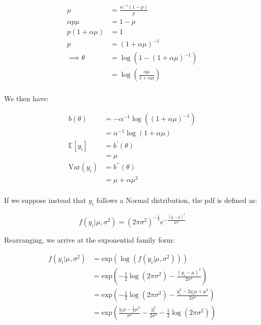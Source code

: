 \documentclass{report}
\begin{document}
\begin{equation}\label{eq:ex-glm-nb-dist-alpha-parameterization}
    \begin{aligned}
      \mu &= \frac{\alpha^{-1}(1-p)}{p} \\
      \alpha p \mu &= 1 - p \\
      p(1+\alpha\mu) &= 1 \\
      p &= (1 + \alpha\mu)^{-1} \\
      \implies \theta 
        &= \log\left(1 - (1+\alpha\mu)^{-1}\right) \\
        &= \log\left(\frac{\alpha\mu}{1+\alpha\mu}\right) \\
    \end{aligned}
\end{equation}

We then have:

\begin{equation}\label{eq:ex-glm-nb-dist-alpha-parameterization-mean-var}
    \begin{aligned}
      b(\theta)
        &= -\alpha^{-1}\log\left((1+\alpha\mu)^{-1}\right) \\
        &= \alpha^{-1}\log(1+\alpha\mu) \\
      \mathbb{E}[y_i]
        &= b^\prime(\theta) \\
        &= \mu \\
      \text{Var}(y_i)
        &= b^{\prime\prime}(\theta) \\
        &= \mu + \alpha\mu^2 \\
    \end{aligned}
\end{equation}

If we suppose instead that $y_i$ follows a Normal distribution, the \gls{pdf} is defined as:

\begin{equation}\label{eq:ex-glm-normal-dist}
    f(y_i|\mu, \sigma^2) = (2\pi\sigma^2)^{-\frac{1}{2}} e^{-\frac{(y_i - \mu)^2}{2\sigma^2}}
\end{equation}

Rearranging, we arrive at the exponential family form:

\begin{equation}\label{eq:ex-glm-normal-dist-exp-form}
    \begin{aligned}
        f(y_i|\mu, \sigma^2) 
          &= \text{exp}(\log(f(y_i|\mu, \sigma^2))) \\
          &= \text{exp}\left(-\frac{1}{2}\log(2\pi\sigma^2) - \frac{(y_i - \mu)^2}{2\sigma^2}\right) \\
          &= \text{exp}\left(-\frac{1}{2}\log(2\pi\sigma^2) - \frac{y_i^2 - 2y_i\mu + \mu^2}{2\sigma^2}\right) \\
          &= \text{exp}\left(\frac{y_i\mu - \frac{1}{2}\mu^2}{\sigma^2} - \frac{y_i^2}{2\sigma^2} - \frac{1}{2}\log(2\pi\sigma^2)\right) \\
    \end{aligned}
\end{equation}
\end{document}
